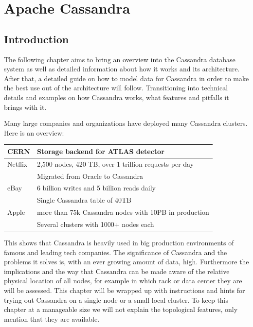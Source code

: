 \chapter{Apache Cassandra}

\section{Introduction}


The following chapter aims to bring an overview into the Cassandra database system as well as detailed information about how it works and its architecture.
After that, a detailed guide on how to model data for Cassandra in order to make the best use out of the architecture will follow.
Transitioning into technical details and examples on how Cassandra works, what features and pitfalls it brings with it.


Many large companies and organizations have deployed many Cassandra clusters.
Here is an overview: \\

 \begin{tabular}{@{}ll}
   CERN    & Storage backend for ATLAS detector \autocite{cassandra_cern} \\
   \hline
   Netflix & 2,500 nodes, 420 TB, over 1 trillion requests per day \\
           & Migrated from Oracle to Cassandra \autocite{cassandra_netflix} \\
   \hline
   eBay    & 6 billion writes and 5 billion reads daily \\
           & Single Cassandra table of 40TB \autocite{cassandra_ebay, cassandra_ebay2} \\
   \hline
   Apple   & more than 75k Cassandra nodes with 10PB in production \\
           & Several clusters with 1000+ nodes each \autocite{cassandra_apple} \\
 \end{tabular}

This shows that Cassandra is heavily used in big production environments of famous and leading tech companies. The significance of Cassandra and the problems it solves is, with an ever growing amount of data, high. Furthermore the implications and the way that Cassandra can be made aware of the relative physical location of all nodes, for example in which rack or data center they are will be assessed. This chapter will be wrapped up with instructions and hints for trying out Cassandra on a single node or a small local cluster. To keep this chapter at a manageable size we will not explain the topological features, only mention that they are available.

